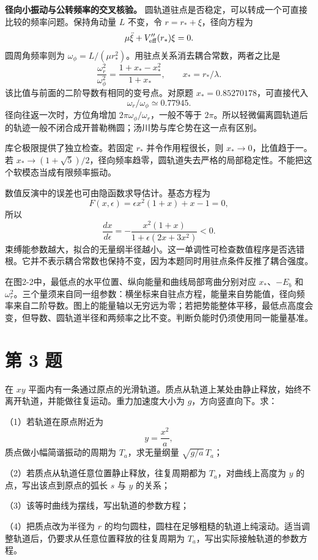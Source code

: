 \documentclass[12pt,a4paper,UTF8]{ctexart}
\begin{document}
\textbf{径向小振动与公转频率的交叉核验。}
圆轨道驻点是否稳定，可以转成一个可直接比较的频率问题。保持角动量 \(L\)
不变，令 \(r=r_*+\xi\)，径向方程为 \[
\mu\ddot\xi+V_{\rm eff}''(r_*)\xi=0.
\] 圆周角频率则为
\(\omega_\phi=L/(\mu r_*^2)\)。用驻点关系消去耦合常数，两者之比是 \[
\frac{\omega_r^2}{\omega_\phi^2}=
\frac{1+x_*-x_*^2}{1+x_*},\qquad x_*=r_*/\lambda.
\] 该比值与前面的二阶导数有相同的变号点。对原题
\(x_*=0.85270178\)，可直接代入 \[
\omega_r/\omega_\phi\simeq0.77945.
\] 径向往返一次时，方位角增加 \(2\pi\omega_\phi/\omega_r\)，一般不等于
\(2\pi\)。所以轻微偏离圆轨道后的轨迹一般不闭合成开普勒椭圆；汤川势与库仑势在这一点有区别。

库仑极限提供了独立检查。若固定 \(r_*\) 并令作用程很长，则
\(x_*\to0\)，比值趋于一。若
\(x_*\to(1+\sqrt5)/2\)，径向频率趋零，圆轨道失去严格的局部稳定性。不能把这个软模态当成有限频率振动。

数值反演中的误差也可由隐函数求导估计。基态方程为 \[
F(x,\epsilon)=\epsilon x^2(1+x)+x-1=0,
\] 所以 \[
\frac{dx}{d\epsilon}=-\frac{x^2(1+x)}{1+\epsilon(2x+3x^2)}<0.
\]
束缚能参数越大，拟合的无量纲半径越小。这一单调性可检查数值程序是否选错根。它并不表示耦合常数也保持不变，因为本题同时用驻点条件反推了耦合强度。

在图2-2中，最低点的水平位置、纵向能量和曲线局部弯曲分别对应
\(x_*\)、\(-E_b\) 和
\(\omega_r^2\)。三个量须来自同一组参数：横坐标来自驻点方程，能量来自势能值，径向频率来自二阶导数。图上的能量轴以无穷远为零；若把势能整体平移，最低点高度会变，但导数、圆轨道半径和两频率之比不变。判断负能时仍须使用同一能量基准。

\newpage

\section{第 3 题}\label{ux7b2c-3-ux9898}

在 \(xy\)
平面内有一条通过原点的光滑轨道。质点从轨道上某处由静止释放，始终不离开轨道，并能做往复运动。重力加速度大小为
\(g\)，方向竖直向下。求：

（1）若轨道在原点附近为 \[
y=\frac{x^2}{a},
\] 质点做小幅简谐振动的周期为 \(T_a\)，求无量纲量 \(\sqrt{g/a}\,T_a\)；

（2）若质点从轨道任意位置静止释放，往复周期都为 \(T_a\)，对曲线上高度为
\(y\) 的点，写出该点到原点的弧长 \(s\) 与 \(y\) 的关系；

（3）该等时曲线为摆线，写出轨道的参数方程；

（4）把质点改为半径为 \(r\)
的均匀圆柱，圆柱在足够粗糙的轨道上纯滚动。适当调整轨道后，仍要求从任意位置释放的往复周期为
\(T_a\)，写出实际接触轨道的参数方程。
\end{document}
